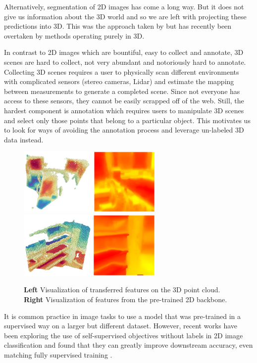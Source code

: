 \documentclass[10pt,twocolumn,letterpaper]{article}
\begin{document}
Alternatively, segmentation of 2D images has come a long way. But it does not give us information about the 3D world and so we are left with projecting these predictions into 3D. This was the approach taken by \cite{} but has recently been overtaken by methods operating purely in 3D.

In contrast to 2D images which are bountiful, easy to collect and annotate, 3D scenes are hard to collect, not very abundant and notoriously hard to annotate. Collecting 3D scenes requires a user to physically scan different environments with complicated sensors (\eg stereo cameras, Lidar) and estimate the mapping between measurements to generate a completed scene. Since not everyone has access to these sensors, they cannot be easily scrapped off of the web. Still, the hardest component is annotation which requires users to manipulate 3D scenes and select only those points that belong to a particular object. This motivates us to look for ways of avoiding the annotation process and leverage un-labeled 3D data instead.

\begin{figure}
    \centering
    \includegraphics[width=7cm]{images/experiments/image-to-point-vis1.png}
    \includegraphics[width=7cm]{images/experiments/image-to-point-vis2.png}
    \caption{\textbf{Left} Visualization of transferred features on the 3D point cloud. \textbf{Right}  Visualization of features from the pre-trained 2D backbone.}
    \label{fig:features2d-3dvis}
\end{figure}

It is common practice in image tasks to use a model that was pre-trained in a supervised way on a larger but different dataset. However, recent works have been exploring the use of self-supervised objectives without labels in 2D image classification and found that they can greatly improve downstream accuracy, even matching fully supervised training \cite{}.
\end{document}
